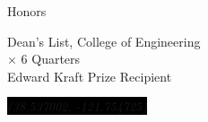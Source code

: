 \documentclass[letterpaper]{article}
\newcommand{\sectiontitle}[1]{
	{\color{magenta} \vline height 1em depth 1pt width 1.5pt}%
	{\large \colorbox{offwhite}{\color{black} \textsc{#1}}}
	\vspace*{0.5em}
}
\newcommand{\sectionseparator}[1]{
	\hline
	\vspace*{1em}
}
\begin{document}
\begin{minipage}[t]{0.35\textwidth}
		\sectionseparator

		\sectiontitle{Honors}

		\begin{small}
		{Dean's List, College of Engineering} \\
		\hspace*{2em} $\times$ {6 Quarters} \\
		{Edward Kraft Prize Recipient} \\
		\end{small}

		\vspace*{4em}

		\begin{center}
			\begin{scriptsize}
				\colorbox{black}{\color{white} \textit{(38.537002, -121.754725)}}
			\end{scriptsize}
		\end{center}

	\end{minipage}
\end{document}
